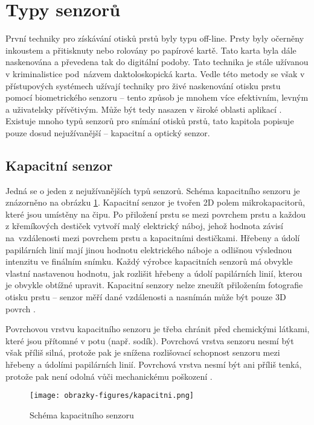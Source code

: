 \section{Typy senzorů}
První techniky pro získávání otisků prstů byly typu off-line. Prsty byly očerněny inkoustem a přitisknuty nebo rolovány po papírové kartě. Tato karta byla dále naskenována a převedena tak do digitální podoby. Tato technika je stále užívanou v kriminalistice pod~názvem daktoloskopická karta. Vedle této metody se však v přístupových systémech užívají techniky pro živé naskenování otisku prstu pomocí biometrického senzoru -- tento způsob je mnohem více efektivním, levným a uživatelsky přívětivým. Může být tedy nasazen v široké oblasti aplikací \cite{Maltoni2009}. Existuje mnoho typů senzorů pro snímání otisků prstů, tato kapitola popisuje pouze dosud nejužívanější -- kapacitní a optický senzor.

\subsection{Kapacitní senzor}
Jedná se o jeden z nejužívanějších typů senzorů. Schéma kapacitního senzoru je znázorněno na obrázku \ref{fig:kapacitni}. Kapacitní senzor je tvořen 2D polem mikrokapacitorů, které jsou umístěny na čipu. Po přiložení prstu se mezi povrchem prstu a každou z křemíkových destiček vytvoří malý elektrický náboj, jehož hodnota závisí na~vzdálenosti mezi povrchem prstu a kapacitními destičkami. Hřebeny a údolí papilárních linií mají jinou hodnotu elektrického náboje a odlišnou výslednou intenzitu ve finálním snímku. Každý výrobce kapacitních senzorů má obvykle vlastní nastavenou hodnotu, jak rozlišit hřebeny a údolí papilárních linií, kterou je obvykle obtížné upravit. Kapacitní senzory nelze zneužít přiložením fotografie otisku prstu -- senzor měří dané vzdálenosti a nasnímán může být pouze 3D povrch \cite{Maltoni2009}. 

Povrchovou vrstvu kapacitního senzoru je třeba chránit před chemickými látkami, které jsou přítomné v potu (např. sodík). Povrchová vrstva senzoru nesmí být však příliš silná, protože pak je snížena rozlišovací schopnost senzoru mezi hřebeny a údolími papilárních linií. Povrchová vrstva nesmí být ani příliš tenká, protože pak není odolná vůči mechanickému poškození \cite{Maltoni2009}. 

\begin{figure}[!htbp]
    \centering
    \texttt{[image: obrazky-figures/kapacitni.png]}
    \caption{Schéma kapacitního senzoru \cite{Maltoni2009}}
    \label{fig:kapacitni}
\end{figure}

